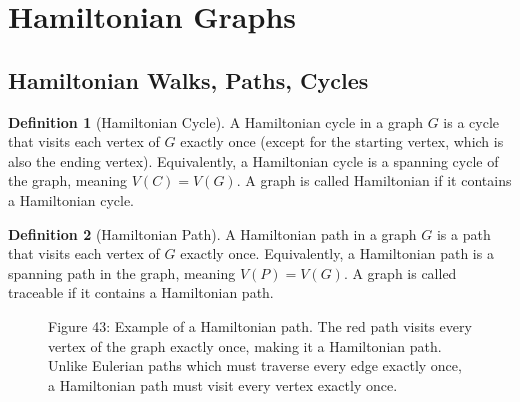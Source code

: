 \documentclass{article}
\theoremstyle{definition}
\newtheorem{definition}{Definition}
\begin{document}
\clearpage

\section{Hamiltonian Graphs}
\subsection{Hamiltonian Walks, Paths, Cycles}

\begin{definition}[Hamiltonian Cycle]
A Hamiltonian cycle in a graph $G$ is a cycle that visits each vertex of $G$ exactly once (except for the starting vertex, which is also the ending vertex). Equivalently, a Hamiltonian cycle is a spanning cycle of the graph, meaning $V(C) = V(G)$. A graph is called Hamiltonian if it contains a Hamiltonian cycle.
\end{definition}

\begin{definition}[Hamiltonian Path]
A Hamiltonian path in a graph $G$ is a path that visits each vertex of $G$ exactly once. Equivalently, a Hamiltonian path is a spanning path in the graph, meaning $V(P) = V(G)$. A graph is called traceable if it contains a Hamiltonian path.
\end{definition}

\begin{figure}[H]
    \centering
    
    \vspace{0.2cm}
    \begin{center}
    \small Figure 43: Example of a Hamiltonian path. The red path visits every vertex of the graph exactly once, making it a Hamiltonian path. Unlike Eulerian paths which must traverse every edge exactly once, a Hamiltonian path must visit every vertex exactly once.
    \end{center}
\end{figure}
\end{document}
